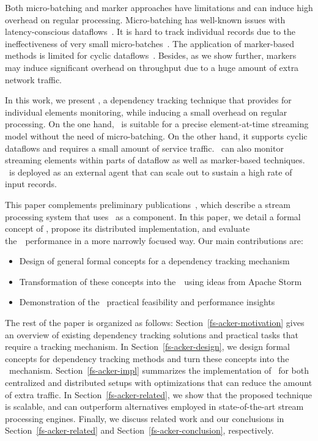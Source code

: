 Both micro-batching and marker approaches have limitations and can induce high overhead on regular processing. Micro-batching has well-known issues with latency-conscious dataflows~\cite{S7530084}. It is hard to track individual records due to the ineffectiveness of very small micro-batches~\cite{Zaharia:2012:DSE:2342763.2342773}. The application of marker-based methods is limited for cyclic dataflows~\cite{Carbone:2017:SMA:3137765.3137777}. Besides, as we show further, markers may induce significant overhead on throughput due to a huge amount of extra network traffic.

In this work, we present \tracker , a dependency tracking technique that provides for individual elements monitoring, while inducing a small overhead on regular processing. On the one hand, \tracker\ is suitable for a precise element-at-time streaming model without the need of micro-batching. On the other hand, it supports cyclic dataflows and requires a small amount of service traffic. \tracker\ can also monitor streaming elements within parts of dataflow as well as marker-based techniques. \tracker\ is deployed as an external agent that can scale out to sustain a high rate of input records. 

This paper complements preliminary publications~\cite{we2018beyondmr, we2018adbis, thepaper}, which describe a stream processing system that uses \tracker\ as a component. In this paper, we detail a formal concept of \tracker , propose its distributed implementation, and evaluate the~\tracker\ performance in a more narrowly focused way. Our main contributions are:
\begin{itemize}
    \item Design of general formal concepts for a dependency tracking mechanism
    \item Transformation of these concepts into the~\tracker\ using ideas from Apache Storm {\em \acker}~\cite{Toshniwal:2014:STO:2588555.2595641}
    \item Demonstration of the \tracker\ practical feasibility and performance insights
\end{itemize}

The rest of the paper is organized as follows: Section~\ref{fs-acker-motivation} gives an overview of existing dependency tracking solutions and practical tasks that require a tracking mechanism. In Section~\ref{fs-acker-design}, we design formal concepts for dependency tracking methods and turn these concepts into the \tracker\ mechanism. Section~\ref{fs-acker-impl} summarizes the implementation of \tracker\ for both centralized and distributed setups with optimizations that can reduce the amount of extra traffic. In Section~\ref{fs-acker-related}, we show that the proposed technique is scalable, and can outperform alternatives employed in state-of-the-art stream processing engines. Finally, we discuss related work and our conclusions in Section~\ref{fs-acker-related} and Section~\ref{fs-acker-conclusion}, respectively.